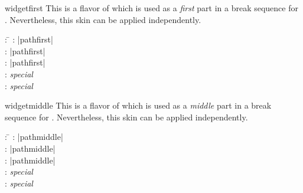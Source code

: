 \begin{docSkin}{widgetfirst}
This is a flavor of  which is used as a \emph{first} part
in a break sequence for .
Nevertheless, this skin can be applied independently.
\begin{tcolorbox}[skintable=widgetfirst]
  \begin{tabbing}
    : \=\kill
    :           \> |pathfirst|\\
    : \> |pathfirst|\\ 
    :        \> |pathfirst|\\
    :    \> \emph{special}\\
    :           \> \emph{special}
  \end{tabbing}
\end{tcolorbox}
\end{docSkin}


\begin{dispExample}
\end{dispExample}

\medskip

\begin{docSkin}{widgetmiddle}
This is a flavor of  which is used as a \emph{middle} part
in a break sequence for .
Nevertheless, this skin can be applied independently.
\begin{tcolorbox}[skintable=widgetmiddle]
  \begin{tabbing}
    : \=\kill
    :           \> |pathmiddle|\\
    : \> |pathmiddle|\\ 
    :        \> |pathmiddle|\\
    :    \> \emph{special}\\
    :           \> \emph{special}
  \end{tabbing}
\end{tcolorbox}
\end{docSkin}

\begin{dispExample}
\end{dispExample}


